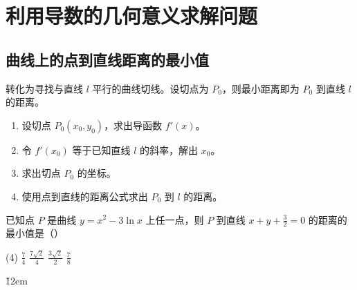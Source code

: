 \section{利用导数的几何意义求解问题}

\subsection{曲线上的点到直线距离的最小值}
\begin{theorem}[曲线到直线距离的最小值]
    转化为寻找与直线 $l$ 平行的曲线切线。设切点为 $P_0$，则最小距离即为 $P_0$ 到直线 $l$ 的距离。
    \begin{enumerate}
        \item 设切点 $P_0(x_0, y_0)$，求出导函数 $f'(x)$。
        \item 令 $f'(x_0)$ 等于已知直线 $l$ 的斜率，解出 $x_0$。
        \item 求出切点 $P_0$ 的坐标。
        \item 使用点到直线的距离公式求出 $P_0$ 到 $l$ 的距离。
    \end{enumerate}
\end{theorem}
\begin{example}
    已知点 $P$ 是曲线 $y = x^{2} - 3\ln x$ 上任一点，则 $P$ 到直线 $x + y + \frac{3}{2} = 0$ 的距离的最小值是（\quad）
    \begin{tasks}(4)
        \task $\frac{7}{4}$ \task $\frac{7\sqrt{2}}{4}$ \task $\frac{3\sqrt{2}}{2}$
        \task $\frac{7}{8}$
    \end{tasks}
\end{example}

\v{12em}